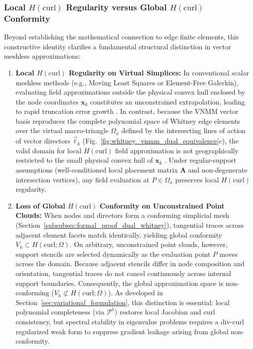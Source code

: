 \documentclass[preprint,12pt]{elsarticle}
\begin{document}
\subsubsection{Local $H(\mathrm{curl})$ Regularity versus Global $H(\mathrm{curl})$ Conformity}
Beyond establishing the mathematical connection to edge finite elements, this constructive identity clarifies a fundamental structural distinction in vector meshless approximations:
\begin{enumerate}
    \item \textbf{Local $H(\mathrm{curl})$ Regularity on Virtual Simplices:} In conventional scalar meshless methods (e.g., Moving Least Squares or Element-Free Galerkin), evaluating field approximations outside the physical convex hull enclosed by the node coordinates $\mathbf{x}_k$ constitutes an unconstrained extrapolation, leading to rapid truncation error growth \cite{lima2017edge}. In contrast, because the VNMM vector basis reproduces the complete polynomial space of Whitney edge elements over the virtual macro-triangle $\Omega_{x}$ defined by the intersecting lines of action of vector directors $\vec{t}_k$ (Fig.~\ref{fig:whitney_vnmm_dual_equivalence}c), the valid domain for local $H(\mathrm{curl})$ field approximation is not geographically restricted to the small physical convex hull of $\mathbf{x}_k$ \cite{nedelec1980mixed, monk2003finite}. Under regular-support assumptions (well-conditioned local placement matrix $\mathbf{A}$ and non-degenerate intersection vertices), any field evaluation at $P \in \Omega_{x}$ preserves local $H(\mathrm{curl})$ regularity.
    \item \textbf{Loss of Global $H(\mathrm{curl})$ Conformity on Unconstrained Point Clouds:} When nodes and directors form a conforming simplicial mesh (Section~\ref{subsubsec:formal_proof_dual_whitney}), tangential traces across adjacent element facets match identically, yielding global conformity $V_h \subset H(\mathrm{curl}; \Omega)$. On arbitrary, unconstrained point clouds, however, support stencils are selected dynamically as the evaluation point $P$ moves across the domain. Because adjacent stencils differ in node composition and orientation, tangential traces do not cancel continuously across internal support boundaries. Consequently, the global approximation space is non-conforming ($V_h \not\subset H(\mathrm{curl}; \Omega)$). As developed in Section~\ref{sec:variational_formulation}, this distinction is essential: local polynomial completeness (via $\mathcal{P}^1$) restores local Jacobian and curl consistency, but spectral stability in eigenvalue problems requires a div-curl regularized weak form to suppress gradient leakage arising from global non-conformity.
\end{enumerate}
\end{document}
